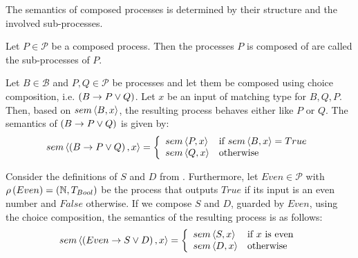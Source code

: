 The semantics of composed processes is determined by their structure and the involved sub-processes.

\begin{definition}
Let $P \in \mathcal{P}$ be a composed process. Then the processes $P$ is composed of are called the sub-processes of $P$.

\hfill\qedsymbol
\end{definition}

\begin{definition}
\label{def:sem_choice}
Let $B \in \mathcal{B}$ and $P, Q \in \mathcal{P}$ be processes and let them be composed using choice composition, i.e. $\left( B \to P \vee Q \right)$. Let $x$ be an input of matching type for $B, Q, P$. Then, based on $sem \left\langle B, x \right\rangle$, the resulting process behaves either like $P$ or $Q$. The semantics of $\left( B \to P \vee Q \right)$ is given by:
  \begin{equation}
    \label{eqn:sem_choice}
    sem \left\langle \left( B \to P \vee Q \right), x \right\rangle = \left\{ \begin{array}{ll}
      sem \left\langle P, x \right\rangle & \text{if } sem \left\langle B, x \right\rangle = True \\
      sem \left\langle Q, x \right\rangle & \text{otherwise}
    \end{array}\right.
  \end{equation}
  
  \hfill\qedsymbol
\end{definition}

\begin{example}
\label{exp:sem_chice}
Consider the definitions of $S$ and $D$ from . Furthermore, let $Even \in \mathcal{P}$ with $\rho \left( Even \right) = \left( \mathbb{N}, T_{Bool} \right)$ be the process that outputs $True$ if its input is an even number and $False$ otherwise. If we compose $S$ and $D$, guarded by $Even$, using the choice composition, the semantics of the resulting process is as follows:
  \begin{equation*}
    sem \left\langle \left( Even \to S \vee D \right), x \right\rangle = \left\{\begin{array}{ll}
      sem \left\langle S, x \right\rangle & \text{if } x \text{ is even} \\
      sem \left\langle D, x \right\rangle & \text{otherwise}
    \end{array}\right.
  \end{equation*}
  \hfill\qedsymbol
\end{example}


